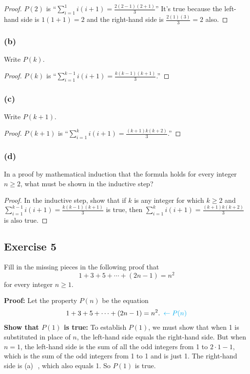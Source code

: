 \documentclass[14pt]{extarticle}
\newcommand{\dps}{\displaystyle}
\newcommand{\fbl}{\underline{\hspace{1cm}}\,\,}
\newcommand{\from}{\leftarrow}
\newcommand{\cy}{\color{cyan}}
\begin{document}
\begin{proof}
$P(2)$ is ``$\dps \sum_{i=1}^{1}i(i+1) = \frac{2(2-1)(2+1)}{3}$'' It's true because the left-hand side is $1(1+1) = 2$ and the right-hand side is $\dps \frac{2(1)(3)}{3} = 2$ also.
\end{proof}

\subsubsection{(b)}
Write $P(k)$.

\begin{proof}
$P(k)$ is ``$\dps \sum_{i=1}^{k-1}i(i+1) = \frac{k(k-1)(k+1)}{3}$.''
\end{proof}

\subsubsection{(c)}
Write $P(k + 1)$.

\begin{proof}
$P(k+1)$ is ``$\dps \sum_{i=1}^{k}i(i+1) = \frac{(k+1)k(k+2)}{3}$.''
\end{proof}

\subsubsection{(d)}
In a proof by mathematical induction that the formula holds for every integer $n \geq 2$, what must be shown in the inductive step?

\begin{proof}
In the inductive step, show that if $k$ is any integer for which $k \geq 2$ and \\ $\dps \sum_{i=1}^{k-1}i(i+1) = \frac{k(k-1)(k+1)}{3}$ is true, then $\dps \sum_{i=1}^{k}i(i+1) = \frac{(k+1)k(k+2)}{3}$ is also true.
\end{proof}

\subsection{Exercise 5}
Fill in the missing pieces in the following proof that
\[
1 + 3 + 5 + \cdots + (2n - 1) = n^2
\]
for every integer $n \geq 1$.

{\bf Proof:} Let the property $P(n)$ be the equation 
\[
1 + 3 + 5 + \cdots + (2n - 1) = n^2. \,\,\,{\cy \from P(n)}
\]
{\bf Show that $P(1)$ is true:} To establish $P(1)$, we must show that when 1 is substituted in place of $n$, the left-hand side equals the right-hand side. But when $n = 1$, the left-hand side is the sum of all the odd integers from 1 to $2\cdot 1 - 1$, which is the sum of the odd integers from 1 to 1 and is just 1. The right-hand side is {\cy (a) \fbl}, which also equals 1. So $P(1)$ is true. 
\end{document}
